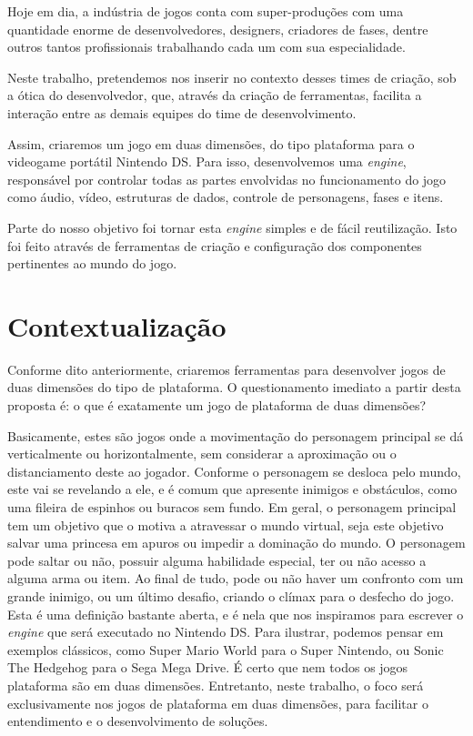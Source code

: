 \documentclass[brazil]{abnt}
\begin{document}
Hoje em dia, a indústria de jogos conta com super-produções com uma quantidade enorme de desenvolvedores, designers, criadores de fases, dentre outros tantos profissionais trabalhando cada um com sua especialidade.

Neste trabalho, pretendemos nos inserir no contexto desses times de criação, sob a ótica do desenvolvedor, que, através da criação de ferramentas, facilita a interação entre as demais equipes do time de desenvolvimento.

Assim, criaremos um jogo em duas dimensões, do tipo plataforma para o videogame portátil Nintendo DS. Para isso, desenvolvemos uma \textit{engine}, responsável por controlar todas as partes envolvidas no funcionamento do jogo como áudio, vídeo, estruturas de dados, controle de personagens, fases e itens.

Parte do nosso objetivo foi tornar esta \textit{engine} simples e de fácil reutilização. Isto foi feito através de ferramentas de criação e configuração dos componentes pertinentes ao mundo do jogo.


\section{Contextualização}

Conforme dito anteriormente, criaremos ferramentas para desenvolver jogos de duas dimensões do tipo de plataforma. O questionamento imediato a partir desta proposta é: o que é exatamente um jogo de plataforma de duas dimensões?

Basicamente, estes são jogos onde a movimentação do personagem principal se dá verticalmente ou horizontalmente, sem considerar a aproximação ou o distanciamento deste ao jogador. Conforme o personagem se desloca pelo mundo, este vai se revelando a ele, e é comum que apresente inimigos e obstáculos, como uma fileira de espinhos ou buracos sem fundo. Em geral, o personagem principal tem um objetivo que o motiva a atravessar o mundo virtual, seja este objetivo salvar uma princesa em apuros ou impedir a dominação do mundo. O personagem pode saltar ou não, possuir alguma habilidade especial, ter ou não acesso a alguma arma ou item. Ao final de tudo, pode ou não haver um confronto com um grande inimigo, ou um último desafio, criando o clímax para o desfecho do jogo. Esta é uma definição bastante aberta, e é nela que nos inspiramos para escrever o \textit{engine} que será executado no Nintendo DS. Para ilustrar, podemos pensar em exemplos clássicos, como Super Mario World para o Super Nintendo, ou Sonic The Hedgehog para o Sega Mega Drive. É certo que nem todos os jogos plataforma são em duas dimensões. Entretanto, neste trabalho, o foco será exclusivamente nos jogos de plataforma em duas dimensões, para facilitar o entendimento e o desenvolvimento de soluções.
\end{document}
